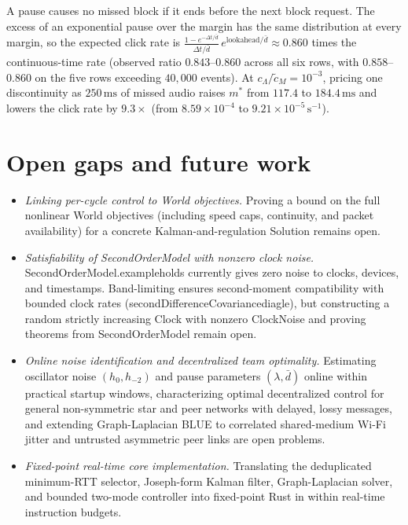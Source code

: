 \documentclass[11pt,a4paper]{article}
\DeclareRobustCommand{\lean}[1]{{\ttfamily\def\_{\textunderscore\allowbreak}#1}}
\theoremstyle{definition}
\begin{document}
A pause causes no missed block if it ends before the next block request. The
excess of an exponential pause over the margin has the same distribution at
every margin, so the expected click rate is
$\frac{1 - e^{-\Delta t / \bar d}}{\Delta t / \bar d}\,e^{\mathrm{lookahead}/\bar d} \approx 0.860$
times the continuous-time rate (observed ratio $0.843$--$0.860$ across all six
rows, with $0.858$--$0.860$ on the five rows exceeding $40{,}000$ events). At
$c_\Lambda / \tilde c_M = 10^{-3}$, pricing one discontinuity as $250\,\text{ms}$
of missed audio raises $m^*$ from $117.4$ to $184.4\,\text{ms}$ and lowers the
click rate by $9.3\times$ (from $8.59{\times}10^{-4}$ to
$9.21{\times}10^{-5}\,\text{s}^{-1}$).

\section{Open gaps and future work}

\begin{itemize}
\item \emph{Linking per-cycle control to \lean{World} objectives.} Proving a
  bound on the full nonlinear \lean{World} objectives (including speed caps,
  continuity, and packet availability) for a concrete Kalman-and-regulation
  \lean{Solution} remains open.
\item \emph{Satisfiability of \lean{SecondOrderModel} with nonzero clock noise.}
  \lean{SecondOrderModel.example\_holds} currently gives zero noise to clocks,
  devices, and timestamps. Band-limiting ensures second-moment compatibility
  with bounded clock rates (\lean{secondDifferenceCovariance\_diag\_le}), but
  constructing a random strictly increasing \lean{Clock} with nonzero
  \lean{ClockNoise} and proving theorems from \lean{SecondOrderModel} remain
  open.
\item \emph{Online noise identification and decentralized team optimality.}
  Estimating oscillator noise $(h_0, h_{-2})$ and pause parameters
  $(\lambda, \bar d)$ online within practical startup windows, characterizing
  optimal decentralized control for general non-symmetric star and peer
  networks with delayed, lossy messages, and extending Graph-Laplacian BLUE to
  correlated shared-medium Wi-Fi jitter and untrusted asymmetric peer links are
  open problems.
\item \emph{Fixed-point real-time core implementation.} Translating the
  deduplicated minimum-RTT selector, Joseph-form Kalman filter, Graph-Laplacian
  solver, and bounded two-mode controller into fixed-point Rust in
   within real-time instruction budgets.
\end{itemize}
\end{document}
